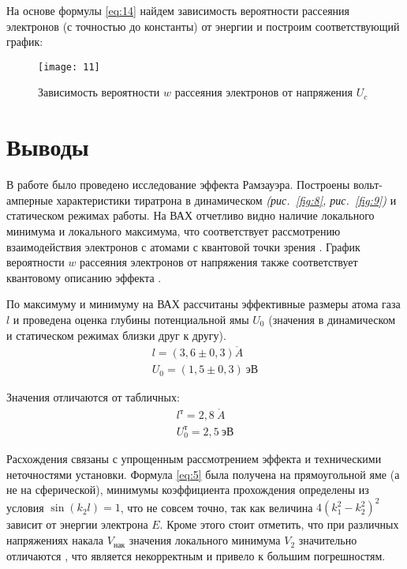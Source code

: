 \documentclass[a4paper, 12pt]{article}
\begin{document}
На основе формулы \eqref{eq:14} найдем зависимость вероятности
рассеяния электронов (с точностью до константы) от энергии и построим
соответствующий график:


\begin{figure}[H]
    \texttt{[image: 11]} 
    \caption{Зависимость вероятности $w$ рассеяния электронов от
    напряжения $U_c$}
    \label{fig:11}
\end{figure}




\section{Выводы}
В работе было проведено исследование эффекта Рамзауэра. Построены
вольт-амперные характеристики тиратрона в динамическом
\textsl{(рис.~\ref{fig:8}, рис.~\ref{fig:9})} и статическом
 режимах
работы. На ВАХ отчетливо видно наличие локального минимума и
локального максимума, что соответствует рассмотрению взаимодействия
электронов с атомами с квантовой точки зрения . График
вероятности $w$ рассеяния электронов от напряжения  также
соответствует квантовому описанию эффекта . 

По максимуму и минимуму на ВАХ рассчитаны эффективные размеры атома
газа $l$ и проведена оценка глубины потенциальной ямы $U_0$ (значения
в динамическом и статическом режимах близки друг к другу).
\begin{equation*}
    \begin{gathered}
        l = (3,6 \pm 0,3) \mathring{A}\\
        U_0 = (1,5 \pm 0,3)\: \text{эВ}
    \end{gathered}
\end{equation*}

Значения отличаются от табличных:
\begin{equation*}
    \begin{gathered}
        l^\text{т} = 2,8\: \mathring{A}\\
        U_0^\text{т} = 2,5\: \text{эВ}
    \end{gathered}
\end{equation*}

Расхождения связаны с упрощенным рассмотрением эффекта и техническими
неточностями установки. Формула
\eqref{eq:5} была получена на прямоугольной яме (а не на сферической),
минимумы коэффициента прохождения 
определены из условия $\sin (k_2 l) = 1$, что не совсем
точно, так как величина $4(k_1^2-k_2^2)^2$ зависит от энергии
электрона $E$. Кроме этого стоит отметить, что
при различных напряжениях накала $V_\text{нак}$ значения локального
минимума $V_2$ значительно отличаются , что является
некорректным и привело к большим погрешностям.
\end{document}
